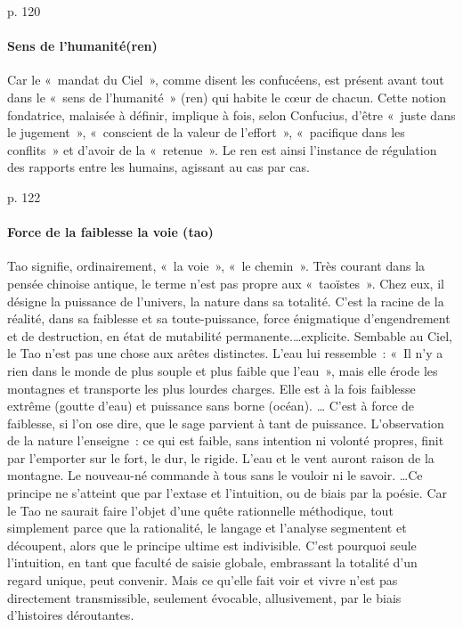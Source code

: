 \cite{PolDroit:voyage} p. 120 

\paragraph{Sens de l'humanité(ren)}
Car le « mandat du Ciel », comme disent les confucéens, est présent avant tout dans le « sens de l’humanité » (ren) qui habite le cœur de chacun. Cette notion fondatrice, malaisée à définir, implique à fois, selon Confucius, d’être « juste dans le jugement », « conscient de la valeur de l’effort », « pacifique dans les conflits » et d’avoir de la « retenue ». Le ren est ainsi l’instance de régulation des rapports entre les humains, agissant au cas par cas.

\cite{PolDroit:voyage} p. 122 

\paragraph{Force de la faiblesse la voie (tao)} Tao signifie, ordinairement, « la voie », « le chemin ». Très courant dans la pensée chinoise antique, le terme n’est pas propre aux « taoïstes ». Chez eux, il désigne la puissance de l’univers, la nature dans sa totalité. C’est la racine de la réalité, dans sa faiblesse et sa toute-puissance, force énigmatique d’engendrement et de destruction, en état de mutabilité permanente.\ldots explicite. Sembable au Ciel, le Tao n’est pas une chose aux arêtes distinctes. L’eau lui ressemble : « Il n’y a rien dans le monde de plus souple et plus faible que l’eau », mais elle érode les montagnes et transporte les plus lourdes charges. Elle est à la fois faiblesse extrême (goutte d’eau) et puissance sans borne (océan). \ldotsvent… C’est à force de faiblesse, si l’on ose dire, que le sage parvient à tant de puissance. L’observation de la nature l’enseigne : ce qui est faible, sans intention ni volonté propres, finit par l’emporter sur le fort, le dur, le rigide. L’eau et le vent auront raison de la montagne. Le nouveau-né commande à tous sans le vouloir ni le savoir. \ldots Ce principe ne s’atteint que par l’extase et l’intuition, ou de biais par la poésie. Car le Tao ne saurait faire l’objet d’une quête rationnelle méthodique, tout simplement parce que la rationalité, le langage et l’analyse segmentent et découpent, alors que le principe ultime est indivisible. C’est pourquoi seule l’intuition, en tant que faculté de saisie globale, embrassant la totalité d’un regard unique, peut convenir. Mais ce qu’elle fait voir et vivre n’est pas directement transmissible, seulement évocable, allusivement, par le biais d’histoires déroutantes.

